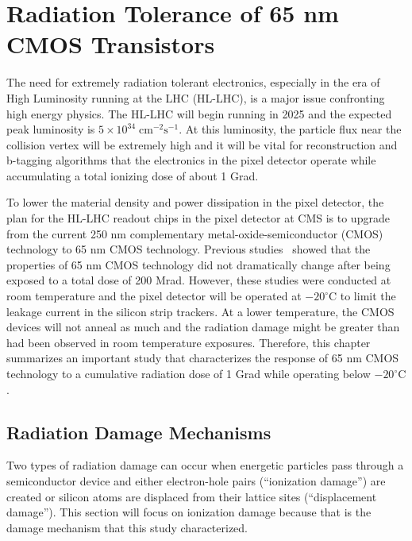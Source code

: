\chapter{Radiation Tolerance of 65 nm CMOS Transistors}
\label{ch:RadStudies}

The need for extremely radiation tolerant electronics, especially in the era of High Luminosity running at the LHC (HL-LHC), is a major issue confronting high energy physics. The HL-LHC will begin running in 2025 and the expected peak luminosity is $5\times10^{34}\; \mathrm{cm}^{-2}\mathrm{s}^{-1}$. At this luminosity, the particle flux near the collision vertex will be extremely high and it will be vital for reconstruction and b-tagging algorithms that the electronics in the pixel detector operate while accumulating a total ionizing dose of about 1 Grad. 

To lower the material density and power dissipation in the pixel detector, the plan for the HL-LHC readout chips in the pixel detector at CMS is to upgrade from the current 250 nm complementary metal-oxide-semiconductor (CMOS) technology to 65 nm CMOS technology. Previous studies~\cite{CMOSXrayRadiation} showed that the properties of 65 nm CMOS technology did not dramatically change after being exposed to a total dose of 200 Mrad. However, these studies were conducted at room temperature and the pixel detector will be operated at $-20^{\circ}\mathrm{C}$ to limit the leakage current in the silicon strip trackers. At a lower temperature, the CMOS devices will not anneal as much and the radiation damage might be greater than had been observed in room temperature exposures. Therefore, this chapter summarizes an important study that characterizes the response of 65 nm CMOS technology to a cumulative radiation dose of 1 Grad while operating below $-20^{\circ}\mathrm{C}$.

\section{Radiation Damage Mechanisms}

Two types of radiation damage can occur when energetic particles pass through a semiconductor device and either electron-hole pairs (``ionization damage'') are created or silicon atoms are displaced from their lattice sites (``displacement damage''). This section will focus on ionization damage because that is the damage mechanism that this study characterized. 

